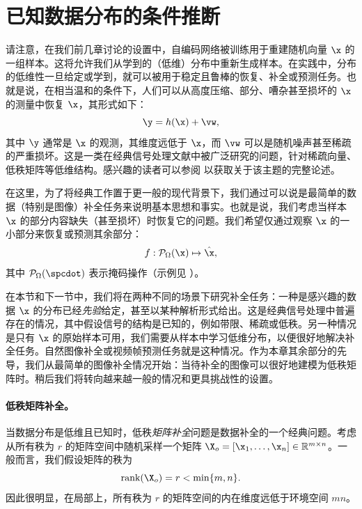 \documentclass[../../book-main_zh.tex]{subfiles}
\begin{document}
\section{已知数据分布的条件推断}
请注意，在我们前几章讨论的设置中，自编码网络被训练用于重建随机向量 $\x$ 的一组样本。这将允许我们从学到的（低维）分布中重新生成样本。在实践中，分布的低维性一旦给定或学到，就可以被用于稳定且鲁棒的恢复、补全或预测任务。也就是说，在相当温和的条件下，人们可以从高度压缩、部分、嘈杂甚至损坏的 $\x$ 的测量中恢复 $\x$，其形式如下：
\begin{equation}
    \y = h(\x) + \vw,
\end{equation}
其中 $\y$ 通常是 $\x$ 的观测，其维度远低于 $\x$，而 $\vw$ 可以是随机噪声甚至稀疏的严重损坏。这是一类在经典信号处理文献中被广泛研究的问题，针对稀疏向量、低秩矩阵等低维结构。感兴趣的读者可以参阅 \cite{Wright-Ma-2022} 以获取关于该主题的完整论述。

在这里，为了将经典工作置于更一般的现代背景下，我们通过可以说是最简单的数据（特别是图像）补全任务来说明基本思想和事实。也就是说，我们考虑当样本 $\x$ 的部分内容缺失（甚至损坏）时恢复它的问题。我们希望仅通过观察 $\x$ 的一小部分来恢复或预测其余部分：
\begin{equation}
    f: \mathcal{P}_{\Omega}(\x) \mapsto \hat{\x},
\end{equation}
其中 $\mathcal{P}_{\Omega}(\spcdot)$ 表示掩码操作（示例见 ）。

在本节和下一节中，我们将在两种不同的场景下研究补全任务：一种是感兴趣的数据 $\x$ 的分布已经{\em 先验}给定，甚至以某种解析形式给出。这是经典信号处理中普遍存在的情况，其中假设信号的结构是已知的，例如带限、稀疏或低秩。另一种情况是只有 $\x$ 的原始样本可用，我们需要从样本中学习低维分布，以便很好地解决补全任务。自然图像补全或视频帧预测任务就是这种情况。作为本章其余部分的先导，我们从最简单的图像补全情况开始：当待补全的图像可以很好地建模为低秩矩阵时。稍后我们将转向越来越一般的情况和更具挑战性的设置。

\paragraph{低秩矩阵补全。}
当数据分布是低维且已知时，低秩{\em 矩阵补全}问题是数据补全的一个经典问题。考虑从所有秩为 $r$ 的矩阵空间中随机采样一个矩阵 $\X_o =
[\x_1, \ldots, \x_n] \in \mathbb{R}^{m\times n}$。一般而言，我们假设矩阵的秩为
\begin{equation}
    \mbox{rank}(\X_o) = r < \min\{m, n\}.
\end{equation}
因此很明显，在局部上，所有秩为 $r$ 的矩阵空间的内在维度远低于环境空间 $mn$。
\end{document}
